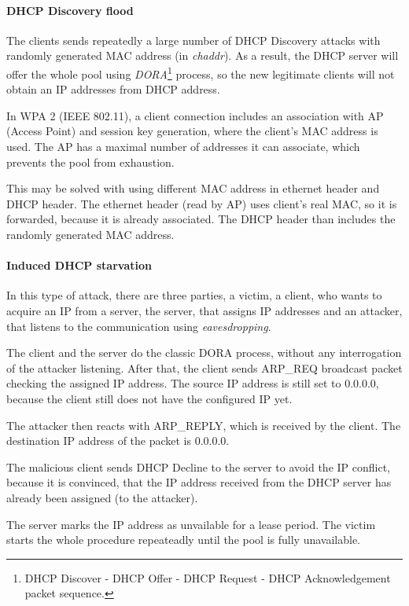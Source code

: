 \documentclass[10pt,a4paper,titlepage]{article}
\begin{document}
    \paragraph{DHCP Discovery flood}
    The clients sends repeatedly a large number of DHCP Discovery attacks with 
    randomly generated MAC address (in {\it chaddr}). As a result, the DHCP server will
    offer the whole pool using {\it DORA}\footnote{DHCP Discover - DHCP Offer - DHCP
    Request - DHCP Acknowledgement packet sequence.} process, so the new legitimate
    clients will not obtain an IP addresses from DHCP address.
    
    In WPA 2 (IEEE 802.11), a client connection includes an association with AP
    (Access Point) and session key generation, where the client's MAC address is used.
    The AP has a maximal number of addresses it can associate, which prevents
    the pool from exhaustion.
    
    This may be solved with using different MAC address in ethernet header and
    DHCP header. The ethernet header (read by AP) uses client's real MAC, so
    it is forwarded, because it is already associated. The DHCP header than includes
    the randomly generated MAC address.
    
    \paragraph{Induced DHCP starvation}
    In this type of attack, there are three parties, a victim, a client, who wants to
    acquire an IP from a server, the server, that assigns IP addresses and an
    attacker, that listens to the communication using {\it eavesdropping}. 
    
    The client and the server do the classic DORA process, without any interrogation
    of the attacker listening. After that, the client sends ARP\_REQ broadcast packet
    checking the assigned IP address. The source IP address is still set to 0.0.0.0,
    because the client still does not have the configured IP yet.
    
    The attacker then reacts with ARP\_REPLY, which is received by the client.
    The destination IP address of the packet is 0.0.0.0.
    
    The malicious client sends DHCP Decline to the server to avoid the IP conflict,
    because it is convinced, that the IP address received from the DHCP server
    has already been assigned (to the attacker).
    
    The server marks the IP address as unvailable for a lease period. The victim starts
    the whole procedure repeateadly until the pool is fully unavailable.
    \cite{IBSattack}
    
\end{document}

